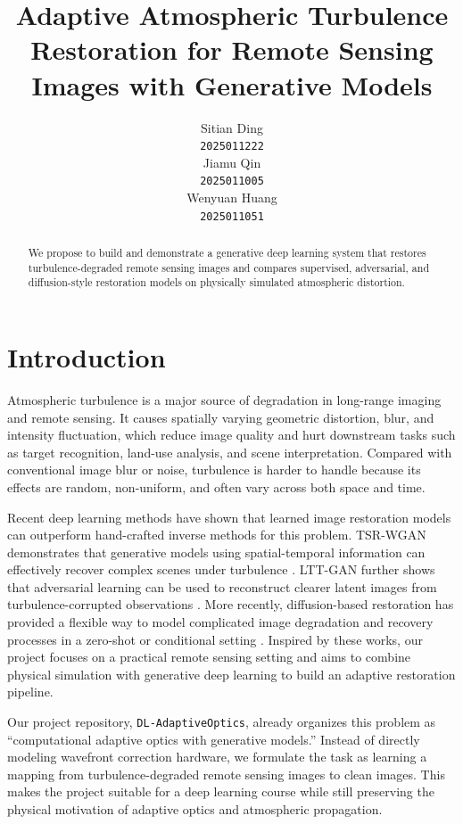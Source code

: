 \documentclass{article}
\title{Adaptive Atmospheric Turbulence Restoration for Remote Sensing Images with Generative Models}
\author{%
  Sitian Ding \\
  \texttt{2025011222} \\
  \And
  Jiamu Qin \\
  \texttt{2025011005} \\
  \And
  Wenyuan Huang \\
  \texttt{2025011051} \\
}
\begin{document}
\maketitle

\begin{abstract}
  We propose to build and demonstrate a generative deep learning system that restores turbulence-degraded remote sensing images and compares supervised, adversarial, and diffusion-style restoration models on physically simulated atmospheric distortion.
\end{abstract}

\section{Introduction}
Atmospheric turbulence is a major source of degradation in long-range imaging and remote sensing. It causes spatially varying geometric distortion, blur, and intensity fluctuation, which reduce image quality and hurt downstream tasks such as target recognition, land-use analysis, and scene interpretation. Compared with conventional image blur or noise, turbulence is harder to handle because its effects are random, non-uniform, and often vary across both space and time.

Recent deep learning methods have shown that learned image restoration models can outperform hand-crafted inverse methods for this problem. TSR-WGAN demonstrates that generative models using spatial-temporal information can effectively recover complex scenes under turbulence \cite{jin2021}. LTT-GAN further shows that adversarial learning can be used to reconstruct clearer latent images from turbulence-corrupted observations \cite{DBLP:journals/corr/abs-2112-02379}. More recently, diffusion-based restoration has provided a flexible way to model complicated image degradation and recovery processes in a zero-shot or conditional setting \cite{wang2022zeroshotimagerestorationusing}. Inspired by these works, our project focuses on a practical remote sensing setting and aims to combine physical simulation with generative deep learning to build an adaptive restoration pipeline.

Our project repository, \texttt{DL-AdaptiveOptics}, already organizes this problem as ``computational adaptive optics with generative models.'' Instead of directly modeling wavefront correction hardware, we formulate the task as learning a mapping from turbulence-degraded remote sensing images to clean images. This makes the project suitable for a deep learning course while still preserving the physical motivation of adaptive optics and atmospheric propagation.
\end{document}
